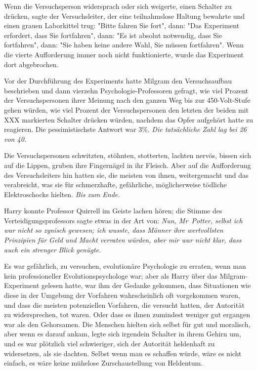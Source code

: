 {Wenn die Versuchsperson widersprach oder sich weigerte, einen Schalter zu drücken, sagte der Versuchsleiter, der eine teilnahmslose Haltung bewahrte und einen grauen Laborkittel trug: "Bitte fahren Sie fort", dann: "Das Experiment erfordert, dass Sie fortfahren", dann: "Es ist absolut notwendig, dass Sie fortfahren", dann: "Sie haben keine andere Wahl, Sie müssen fortfahren". Wenn die vierte Aufforderung immer noch nicht funktionierte, wurde das Experiment dort abgebrochen.

Vor der Durchführung des Experiments hatte Milgram den Versuchsaufbau beschrieben und dann vierzehn Psychologie-Professoren gefragt, wie viel Prozent der Versuchspersonen ihrer Meinung nach den ganzen Weg bis zur 450-Volt-Stufe gehen würden, wie viel Prozent der Versuchspersonen den letzten der beiden mit XXX markierten Schalter drücken würden, nachdem das Opfer aufgehört hatte zu reagieren. Die pessimistischste Antwort war 3\%. \emph{Die tatsächliche Zahl lag bei 26 von 40.}

Die Versuchspersonen schwitzten, stöhnten, stotterten, lachten nervös, bissen sich auf die Lippen, gruben ihre Fingernägel in ihr Fleisch. Aber auf die Aufforderung des Versuchsleiters hin hatten sie, die meisten von ihnen, weitergemacht und das verabreicht, was sie für schmerzhafte, gefährliche, möglicherweise tödliche Elektroschocks hielten. \emph{Bis zum Ende.}

Harry konnte Professor Quirrell im Geiste lachen hören; die Stimme des Verteidigungsprofessors sagte etwas in der Art von: \emph{Nun, Mr~Potter, selbst ich war nicht so zynisch gewesen; ich wusste, dass Männer ihre wertvollsten Prinzipien für Geld und Macht verraten würden, aber mir war nicht klar, dass auch ein strenger Blick genügte.}

Es war gefährlich, zu versuchen, evolutionäre Psychologie zu erraten, wenn man kein professioneller Evolutionspsychologe war; aber als Harry über das Milgram-Experiment gelesen hatte, war ihm der Gedanke gekommen, dass Situationen wie diese in der Umgebung der Vorfahren wahrscheinlich oft vorgekommen waren, und dass die meisten potenziellen Vorfahren, die versucht hatten, der Autorität zu widersprechen, tot waren. Oder dass es ihnen zumindest weniger gut ergangen war als den Gehorsamen. Die Menschen hielten sich selbst für gut und moralisch, aber wenn es darauf ankam, legte sich irgendein Schalter in ihrem Gehirn um, und es war plötzlich viel schwieriger, sich der Autorität heldenhaft zu widersetzen, als sie dachten. Selbst wenn man es schaffen würde, wäre es nicht einfach, es wäre keine mühelose Zurschaustellung von Heldentum.

}
